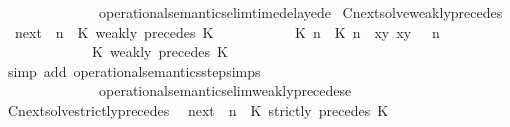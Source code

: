 \begin{isabellebody}
\ \ \ \ \ \ \ \ \ \ \ \ \ \ operational{\isacharunderscore}semantics{\isacharunderscore}elim{\isachardot}timedelayed{\isacharunderscore}e{}{\isacharparenright}%
\endisatagproof
{\isafoldproof}%
%
\isadelimproof
\isanewline
%
\endisadelimproof
\isanewline
{}\isamarkupfalse%
\ Cnext{\isacharunderscore}solve{\isacharunderscore}weakly{\isacharunderscore}precedes{\isacharcolon}\isanewline
\ \ {\isacartoucheopen}{\isacharparenleft}{\isasymC}\isactrlsub n\isactrlsub e\isactrlsub x\isactrlsub t\ {\isacharparenleft}{\isasymGamma}{\isacharcomma}\ n\ {\isasymturnstile}\ {\isacharparenleft}{\isacharparenleft}K\ weakly\ precedes\ K\ {\isacharhash}\ {\isasymPsi}{\isacharparenright}\ {\isasymtriangleright}\ {\isasymPhi}{\isacharparenright}{\isacharparenright}\isanewline
\ \ \ \ {\isasymsupseteq}\ {\isacharbraceleft}\ {\isacharparenleft}{\isacharparenleft}{\isasymlceil}{\isacharhash}\isactrlsup {\isasymle}\ K\ n{\isacharcomma}\ {\isacharhash}\isactrlsup {\isasymle}\ K\ n{\isasymrceil}\ {\isasymin}\ {\isacharparenleft}{\isasymlambda}{\isacharparenleft}x{\isacharcomma}y{\isacharparenright}{\isachardot}\ x{\isasymle}y{\isacharparenright}{\isacharparenright}\ {\isacharhash}\ {\isasymGamma}{\isacharparenright}{\isacharcomma}\ n\isanewline
\ \ \ \ \ \ \ \ \ \ {\isasymturnstile}\ {\isasymPsi}\ {\isasymtriangleright}\ {\isacharparenleft}{\isacharparenleft}K\ weakly\ precedes\ K\ {\isacharhash}\ {\isasymPhi}{\isacharparenright}\ {\isacharbraceright}{\isacartoucheclose}\isanewline
%
\isadelimproof
%
\endisadelimproof
%
\isatagproof
{}\isamarkupfalse%
\ {\isacharparenleft}simp\ add{\isacharcolon}\ operational{\isacharunderscore}semantics{\isacharunderscore}step{\isachardot}simps\isanewline
\ \ \ \ \ \ \ \ \ \ \ \ \ \ operational{\isacharunderscore}semantics{\isacharunderscore}elim{\isachardot}weakly{\isacharunderscore}precedes{\isacharunderscore}e{\isacharparenright}%
\endisatagproof
{\isafoldproof}%
%
\isadelimproof
\isanewline
%
\endisadelimproof
\isanewline
{}\isamarkupfalse%
\ Cnext{\isacharunderscore}solve{\isacharunderscore}strictly{\isacharunderscore}precedes{\isacharcolon}\isanewline
\ \ {\isacartoucheopen}{\isacharparenleft}{\isasymC}\isactrlsub n\isactrlsub e\isactrlsub x\isactrlsub t\ {\isacharparenleft}{\isasymGamma}{\isacharcomma}\ n\ {\isasymturnstile}\ {\isacharparenleft}{\isacharparenleft}K\ strictly\ precedes\ K\ {\isacharhash}\ {\isasymPsi}{\isacharparenright}\ {\isasymtriangleright}\ {\isasymPhi}{\isacharparenright}{\isacharparenright}\isanewline

\end{isabellebody}
